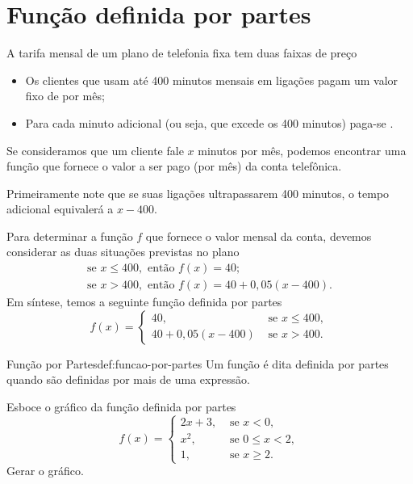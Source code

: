 \section{Função definida por partes}

A tarifa mensal de um plano de telefonia fixa tem duas faixas de preço
\begin{itemize}
  \item Os clientes que usam até 400 minutos mensais em ligações
    pagam um valor fixo de  por mês;

  \item Para cada minuto adicional (ou seja, que excede os 400 minutos)
    paga-se .
\end{itemize}

Se consideramos que um cliente fale $x$ minutos por mês,
podemos encontrar uma função que fornece o valor a ser pago
(por mês) da conta telefônica.

Primeiramente note que se suas ligações ultrapassarem 400 minutos, o tempo
adicional equivalerá a $x-400$.

Para determinar a função $f$ que fornece o valor mensal da conta, devemos
considerar as duas situações previstas no plano
\begin{gather*}
  \text{se } x \leq 400, \text{ então } f(x) = 40; \\
  \text{se } x    > 400, \text{ então } f(x) = 40+0,05(x-400).
\end{gather*}
Em síntese, temos a seguinte função definida por partes
\[
  f(x) = \begin{cases}
  40,            & \text{ se } x \leq 400, \\
  40+0,05(x-400) & \text{ se } x    > 400.
  \end{cases}
\]

\begin{definicao}{Função por Partes}{def:funcao-por-partes}
  Um função é dita definida por partes
  quando são definidas por mais de uma expressão.
\end{definicao}

\begin{example}
  Esboce o gráfico da função definida por partes
  \[
    f(x)=\begin{cases}
      2x+3, & \text{ se } x < 0,        \\
      x^2,  & \text{ se } 0 \leq x < 2, \\
      1,    & \text{ se } x \geq 2.
    \end{cases}
  \]
  {\large \color{red} Gerar o gráfico.}
\end{example}

